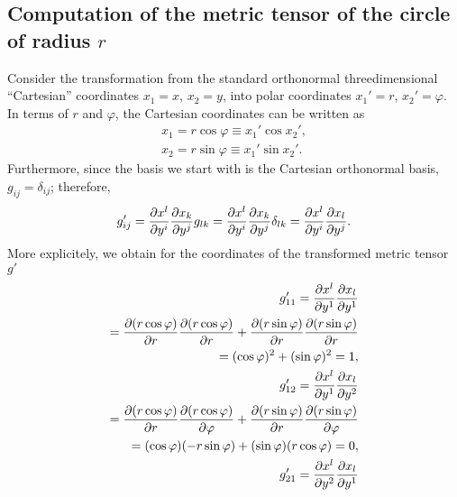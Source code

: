 {
\color{blue}
\bexample

\subsection*{Computation of the metric tensor of the circle of radius $r$}
Consider the transformation from the standard orthonormal
threedimensional ``Cartesian'' coordinates
$x_1=x$,
$x_2=y$,
into polar coordinates
$x_1'=r$,
$x_2'=\varphi$.
In terms of  $r$ and $\varphi$, the Cartesian coordinates can be written as
\begin{equation}
\begin{split}
 x_1=r \cos \varphi \equiv x_1' \cos x_2'  , \\
 x_2=r \sin \varphi \equiv x_1'\sin x_2'  .
\end{split}
\end{equation}
Furthermore,  since the basis we start with is the Cartesian orthonormal basis,
$g_{ij}=\delta_{ij}$; therefore,
\begin{equation}
g'_{ij}= {\partial {x}^l\over \partial { y }^i}{\partial {x}_k\over \partial { y }^j} g_{lk}
= {\partial {x}^l\over \partial { y }^i}{\partial {x}_k\over \partial { y }^j} \delta_{lk}
= {\partial {x}^l\over \partial { y }^i}{\partial {x}_l\over \partial { y }^j}.
\end{equation}
More explicitely, we obtain for the coordinates of the transformed metric tensor $g'$
\begin{equation}
\begin{split}
g'_{11}
= {\partial {x}^l\over \partial { y }^1}{\partial {x}_l\over \partial { y }^1} \\
=
{\partial (r \cos \varphi) \over \partial {r}}{\partial (r \cos \varphi) \over \partial {r}}
+
{\partial (r \sin \varphi) \over \partial {r}}{\partial (r \sin \varphi) \over \partial {r}}       \\
=
( \cos \varphi )^2
+
(\sin \varphi )^2 =1,\\
g'_{12}
= {\partial {x}^l\over \partial { y }^1}{\partial {x}_l\over \partial { y }^2} \\
=
{\partial (r \cos \varphi) \over \partial {r}}{\partial (r \cos \varphi) \over \partial {\varphi }}
+
{\partial (r \sin \varphi) \over \partial {r}}{\partial (r \sin \varphi) \over \partial {\varphi }}  \\
=
(\cos \varphi ) (- r \sin \varphi )
+
(\sin \varphi )( r \cos \varphi )  =0,\\
g'_{21}
= {\partial {x}^l\over \partial { y }^2}{\partial {x}_l\over \partial { y }^1} \\

\end{split}
\end{equation}}
